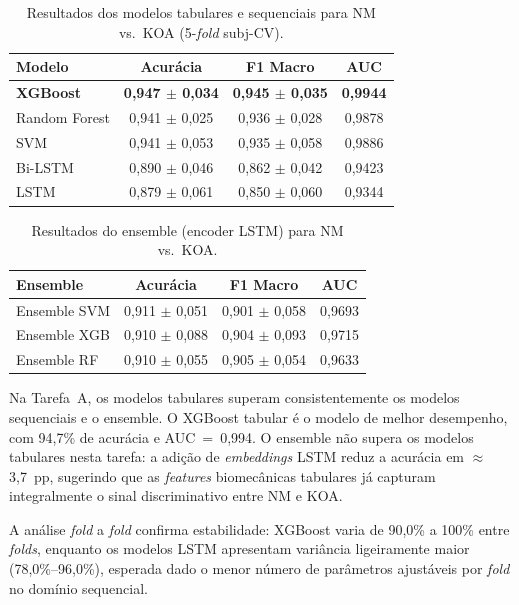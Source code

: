 \documentclass[a4paper,12pt]{article}
\begin{document}
\begin{table}[H]
  \centering
  \caption{Resultados dos modelos tabulares e sequenciais para NM vs.\ KOA
           (5-\textit{fold} subj-CV).}
  \label{tab:taskA_base}
  \begin{tabular}{@{}lccc@{}}
    \toprule
    \textbf{Modelo} & \textbf{Acurácia} & \textbf{F1 Macro} & \textbf{AUC} \\
    \midrule
    \textbf{XGBoost}  & \textbf{0,947 $\pm$ 0,034} & \textbf{0,945 $\pm$ 0,035}
                      & \textbf{0,9944} \\
    Random Forest     & 0,941 $\pm$ 0,025 & 0,936 $\pm$ 0,028 & 0,9878 \\
    SVM               & 0,941 $\pm$ 0,053 & 0,935 $\pm$ 0,058 & 0,9886 \\
    Bi-LSTM           & 0,890 $\pm$ 0,046 & 0,862 $\pm$ 0,042 & 0,9423 \\
    LSTM              & 0,879 $\pm$ 0,061 & 0,850 $\pm$ 0,060 & 0,9344 \\
    \bottomrule
  \end{tabular}
\end{table}

\begin{table}[H]
  \centering
  \caption{Resultados do ensemble (encoder LSTM) para NM vs.\ KOA.}
  \label{tab:taskA_ens}
  \begin{tabular}{@{}lccc@{}}
    \toprule
    \textbf{Ensemble} & \textbf{Acurácia} & \textbf{F1 Macro} & \textbf{AUC} \\
    \midrule
    Ensemble SVM & 0,911 $\pm$ 0,051 & 0,901 $\pm$ 0,058 & 0,9693 \\
    Ensemble XGB & 0,910 $\pm$ 0,088 & 0,904 $\pm$ 0,093 & 0,9715 \\
    Ensemble RF  & 0,910 $\pm$ 0,055 & 0,905 $\pm$ 0,054 & 0,9633 \\
    \bottomrule
  \end{tabular}
\end{table}

Na Tarefa~A, os modelos tabulares superam consistentemente os modelos sequenciais e o
ensemble. O XGBoost tabular é o modelo de melhor desempenho, com 94,7\% de acurácia e
AUC~=~0,994. O ensemble não supera os modelos tabulares nesta tarefa: a adição de
\textit{embeddings} LSTM reduz a acurácia em $\approx$3,7~pp, sugerindo que as
\textit{features} biomecânicas tabulares já capturam integralmente o sinal
discriminativo entre NM e KOA.

A análise \textit{fold} a \textit{fold} confirma estabilidade: XGBoost varia de
90,0\% a 100\% entre \textit{folds}, enquanto os modelos LSTM apresentam variância
ligeiramente maior (78,0\%--96,0\%), esperada dado o menor número de parâmetros
ajustáveis por \textit{fold} no domínio sequencial.
\end{document}
